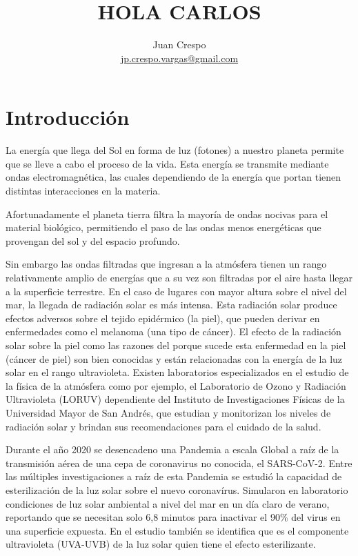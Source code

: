 \documentclass[letterpaper,11pt]{article}
\title{HOLA CARLOS}
\author{Juan Crespo  \\  \url{jp.crespo.vargas@gmail.com}}
\date{} %
\begin{document}
\maketitle


\begin{abstract}
  
\end{abstract}
  
\section{Introducción}
\label{sec:intro}
La energía que llega del Sol en forma de luz (fotones) a nuestro planeta permite que se lleve a cabo el proceso de la vida. Esta energía se transmite mediante ondas electromagnética, las cuales dependiendo de la energía que portan tienen distintas interacciones en la materia. 

Afortunadamente el planeta tierra filtra la mayoría de ondas nocivas para el material biológico, permitiendo el paso de las ondas menos energéticas que provengan del sol y del espacio profundo.

Sin embargo las ondas filtradas que ingresan a la atmósfera tienen un rango relativamente amplio de energías que a su vez son filtradas por el aire hasta llegar a la superficie terrestre. En el caso de lugares con mayor altura sobre el nivel del mar, la llegada de radiación solar es más intensa. Esta radiación solar produce efectos adversos sobre el tejido epidérmico (la piel), que pueden derivar en enfermedades como el melanoma (una tipo de cáncer). El efecto de la radiación solar sobre la piel como las razones del porque sucede esta enfermedad en la piel (cáncer de piel) son bien conocidas y están relacionadas con la energía de la luz solar en el rango ultravioleta. Existen laboratorios especializados en el estudio de la física de la atmósfera como por ejemplo, el Laboratorio de Ozono y Radiación Ultravioleta (LORUV) dependiente del Instituto de Investigaciones Físicas de la Universidad Mayor de San Andrés, que estudian y monitorizan los niveles de radiación solar y brindan sus recomendaciones para el cuidado de la salud. 

Durante el año 2020 se desencadeno una Pandemia a escala Global a raíz de la transmisión aérea de una cepa de coronavirus no conocida, el SARS-CoV-2. Entre las múltiples investigaciones a raíz de esta Pandemia se estudió la capacidad de esterilización de la luz solar \cite{covidsol} sobre el nuevo coronavírus. Simularon en laboratorio condiciones de luz solar ambiental a nivel del mar en un día claro de verano, reportando que se necesitan solo 6,8 minutos para inactivar el 90\% del virus en una superficie expuesta. En el estudio también se identifica que es el componente ultravioleta (UVA-UVB) de la luz solar quien tiene el efecto esterilizante. 
\end{document}
